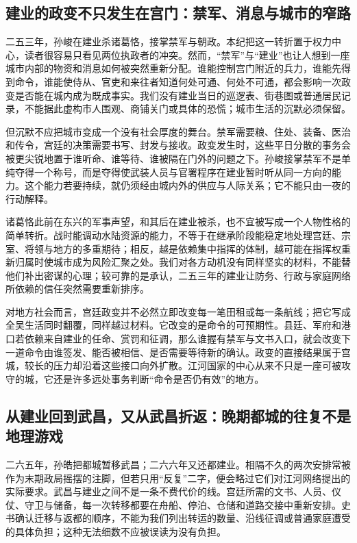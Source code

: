 \subsection{建业的政变不只发生在宫门：禁军、消息与城市的窄路}
二五三年，孙峻在建业杀诸葛恪，接掌禁军与朝政。本纪把这一转折置于权力中心，读者很容易只看见两位执政者的冲突。然而，“禁军”与“建业”也让人想到一座城市内部的物资和消息如何被突然重新分配。谁能控制宫门附近的兵力，谁能先得到命令，谁能使侍从、官吏和来往者知道何处可通、何处不可通，都会影响一次政变是否能在城内成为既成事实。我们没有建业当日的巡逻表、街巷图或普通居民记录，不能据此虚构市人围观、商铺关门或具体的恐慌；城市生活的沉默必须保留。

但沉默不应把城市变成一个没有社会厚度的舞台。禁军需要粮、住处、装备、医治和传令，宫廷的决策需要书写、封发与接收。政变发生时，这些平日分散的事务会被更尖锐地置于谁听命、谁等待、谁被隔在门外的问题之下。孙峻接掌禁军不是单纯夺得一个称号，而是夺得使武装人员与官署程序在建业暂时听从同一方向的能力。这个能力若要持续，就仍须经由城内外的供应与人际关系；它不能只由一夜的行动解释。

诸葛恪此前在东兴的军事声望，和其后在建业被杀，也不宜被写成一个人物性格的简单转折。战时能调动水陆资源的能力，不等于在继承阶段能稳定地处理宫廷、宗室、将领与地方的多重期待；相反，越是依赖集中指挥的体制，越可能在指挥权重新归属时使城市成为风险汇聚之处。我们对各方动机没有同样坚实的材料，不能替他们补出密谋的心理；较可靠的是承认，二五三年的建业让防务、行政与家庭网络所依赖的信任突然需要重新排序。

对地方社会而言，宫廷政变并不必然立即改变每一笔田租或每一条航线；把它写成全吴生活同时翻覆，同样越过材料。它改变的是命令的可预期性。县廷、军府和港口若依赖来自建业的任命、赏罚和征调，那么谁握有禁军与文书入口，就会改变下一道命令由谁签发、能否被相信、是否需要等待新的确认。政变的直接结果属于宫城，较长的压力却沿着这些接口向外扩散。江河国家的中心从来不只是一座可被攻守的城，它还是许多远处事务判断“命令是否仍有效”的地方。

\subsection{从建业回到武昌，又从武昌折返：晚期都城的往复不是地理游戏}
二六五年，孙皓把都城暂移武昌；二六六年又还都建业。相隔不久的两次安排常被作为末期政局摇摆的注脚，但若只用“反复”二字，便会略过它们对江河网络提出的实际要求。武昌与建业之间不是一条不费代价的线。宫廷所需的文书、人员、仪仗、守卫与储备，每一次转移都要在舟船、停泊、仓储和道路交接中重新安排。史书确认迁移与返都的顺序，不能为我们列出转运的数量、沿线征调或普通家庭遭受的具体负担；这种无法细数不应被误读为没有负担。

